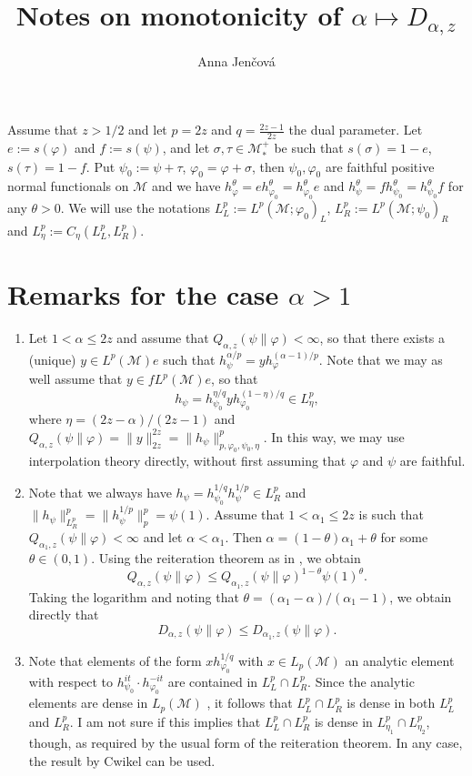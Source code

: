\documentclass[12pt]{article}
\title{Notes on monotonicity of  $\alpha\mapsto D_{\alpha,z}$}
\author{Anna Jen\v cov\'a}
\theoremstyle{definition}
\theoremstyle{remark}
\def\Me{\mathcal M}
\begin{document}
\maketitle

Assume that $z>1/2$ and let $p=2z$ and $q=\frac{2z-1}{2z}$ the dual parameter. 
Let $e:=s(\varphi)$ and $f:=s(\psi)$, and let $\sigma,\tau\in \Me_*^+$ be such that
$s(\sigma)=1-e$, $s(\tau)=1-f$. Put $\psi_0:=\psi+\tau$, $\varphi_0=\varphi+\sigma$, then
$\psi_0,\varphi_0$ are faithful positive normal functionals on $\Me$ and we have
$h_{\varphi}^\theta=eh_{\varphi_0}^\theta=h_{\varphi_0}^\theta e$ and
$h_{\psi}^\theta=fh_{\psi_0}^\theta=h_{\psi_0}^\theta f$ for any $\theta>0$. 
We will use the notations $L^p_L:=L^p(\Me;\varphi_0)_L$, $L^p_R:=L^p(\Me;\psi_0)_R$ and 
$L^p_\eta:=C_\eta(L^p_L,L^p_R)$.


\section{Remarks for the case $\alpha>1$}

\begin{enumerate}
\item Let $1<\alpha\le 2z$ and assume that $Q_{\alpha,z}(\psi\|\varphi)<\infty$, so that there
exists a (unique) $y\in L^p(\Me)e$ such that
$h_\psi^{\alpha/p}=yh_\varphi^{(\alpha-1)/p}$. Note that we may as well assume that $y\in
fL^p(\Me)e$, so that
\[
h_\psi=h_{\psi_0}^{\eta/q}yh_{\varphi_0}^{(1-\eta)/q}\in L^p_\eta,
\]
where $\eta=(2z-\alpha)/(2z-1)$ and
$Q_{\alpha,z}(\psi\|\varphi)=\|y\|_{2z}^{2z}=\|h_\psi\|_{p,\varphi_0,\psi_0,\eta}^p$. In
this way, we may use interpolation theory directly, without first assuming that $\varphi$
and $\psi$ are faithful. 

\item Note that we always have $h_\psi=h_{\psi_0}^{1/q}h_\psi^{1/p}\in L^p_R$ and
$\|h_\psi\|_{L^p_R}^p=\|h_\psi^{1/p}\|_p^p=\psi(1)$. 
Assume that $1<\alpha_1\le 2z$ is such that $Q_{\alpha_1,z}(\psi\|\varphi)<\infty$ and let
$\alpha<\alpha_1$. Then $\alpha=(1-\theta)\alpha_1+\theta$ for some 
$\theta\in (0,1)$. Using the reiteration theorem as in \cite{FHnote6}, we obtain
\[
Q_{\alpha,z}(\psi\|\varphi)\le Q_{\alpha_1,z}(\psi\|\varphi)^{1-\theta}\psi(1)^{\theta}.
\]
Taking the logarithm and noting that $\theta=(\alpha_1-\alpha)/(\alpha_1-1)$, we obtain
directly that 
\[
D_{\alpha,z}(\psi\|\varphi)\le D_{\alpha_1,z}(\psi\|\varphi).
\]

\item Note that elements of the form $xh_{\varphi_0}^{1/q}$ with $x\in L_p(\Me)$ an
analytic element with respect to $h_{\psi_0}^{it}\cdot h_{\varphi_0}^{-it}$ are contained
in $L^p_L\cap L^p_R$. Since the analytic elements are dense in $L_p(\Me)$ \cite[Lemma
10.4]{kosaki1984applications}, it follows that $L^p_L\cap L^p_R$ is dense in both $L^p_L$
and $L^p_R$. I am not sure if this implies that $L^p_L\cap L^p_R$ is dense in
$L^p_{\eta_1}\cap L^p_{\eta_2}$, though, as required by the usual form of the reiteration
theorem. In any case, the result by Cwikel can be used.

\end{enumerate}
\end{document}
